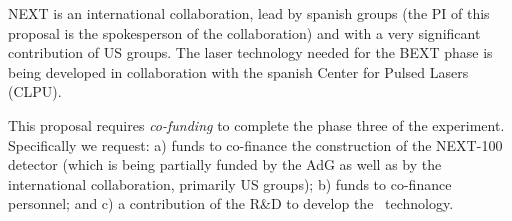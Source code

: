 NEXT is an international collaboration, lead by spanish groups (the PI of this proposal is the spokesperson of the collaboration) and with a very significant contribution of US groups. The laser technology needed for the BEXT phase is being developed in collaboration with the spanish Center for Pulsed Lasers (CLPU). 

 This proposal requires {\em co-funding} to complete the phase three of the experiment. Specifically we request: a) funds to co-finance the construction of the NEXT-100 detector (which is being partially funded by the AdG as well as by the international collaboration, primarily US groups); b) funds to co-finance personnel; and c) a  contribution of the R\&D to develop the \BATA\ technology.   

